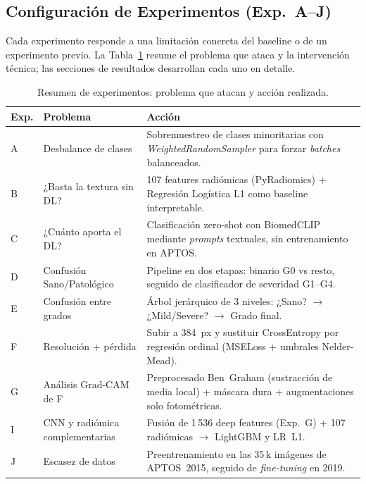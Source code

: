 \documentclass[12pt, a4paper]{article}
\begin{document}
\subsection{Configuración de Experimentos (Exp.~A--J)}
\label{sec:experimentos}

Cada experimento responde a una limitación concreta del baseline o de un
experimento previo. La Tabla~\ref{tab:experimentos} resume el problema que
ataca y la intervención técnica; las secciones de resultados desarrollan
cada uno en detalle.

\begin{table}[H]
\centering
\small
\caption{Resumen de experimentos: problema que atacan y acción realizada.}
\label{tab:experimentos}
\begin{tabularx}{\textwidth}{l l X}
\toprule
\rowcolor{azuloscuro!15}
\textbf{Exp.} & \textbf{Problema} & \textbf{Acción} \\
\midrule
A & Desbalance de clases
  & Sobremuestreo de clases minoritarias con
    \textit{WeightedRandomSampler} para forzar \textit{batches}
    balanceados. \\
\rowcolor{grisclaro}
B & ¿Basta la textura sin DL?
  & 107 features radiómicas (PyRadiomics) + Regresión Logística L1
    como baseline interpretable. \\
C & ¿Cuánto aporta el DL?
  & Clasificación zero-shot con BiomedCLIP mediante \textit{prompts}
    textuales, sin entrenamiento en APTOS. \\
\rowcolor{grisclaro}
D & Confusión Sano/Patológico
  & Pipeline en dos etapas: binario G0 vs resto, seguido de
    clasificador de severidad G1--G4. \\
E & Confusión entre grados
  & Árbol jerárquico de 3 niveles: ¿Sano? $\to$ ¿Mild/Severe?
    $\to$ Grado final. \\
\rowcolor{grisclaro}
F & Resolución + pérdida 
  & Subir a 384~px y sustituir CrossEntropy por regresión ordinal
    (MSELoss + umbrales Nelder-Mead). \\
G & Análisis Grad-CAM de F
  & Preprocesado Ben~Graham (sustracción de media local) + máscara
    dura + augmentaciones solo fotométricas. \\
\rowcolor{grisclaro}
I & CNN y radiómica complementarias
  & Fusión de 1\,536 deep features (Exp.~G) + 107 radiómicas
    $\to$ LightGBM y LR~L1. \\
J & Escasez de datos 
  & Preentrenamiento en las 35\,k imágenes de APTOS~2015, seguido
    de \textit{fine-tuning} en 2019. \\
\bottomrule
\end{tabularx}
\end{table}
\end{document}
